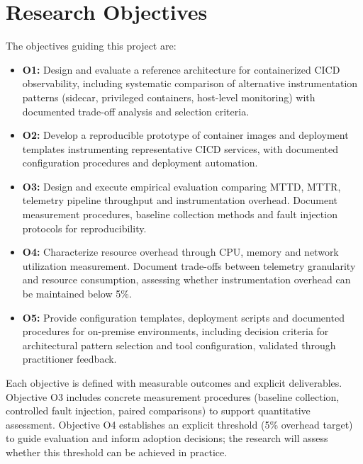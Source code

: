 \section{Research Objectives}
The objectives guiding this project are:
\begin{itemize}
    \item \textbf{O1:} Design and evaluate a reference architecture for containerized \ac{CICD} observability, including systematic comparison of alternative instrumentation patterns (sidecar, privileged containers, host-level monitoring) with documented trade-off analysis and selection criteria.
    \item \textbf{O2:} Develop a reproducible prototype of container images and deployment templates instrumenting representative \ac{CICD} services, with documented configuration procedures and deployment automation.
    \item \textbf{O3:} Design and execute empirical evaluation comparing \ac{MTTD}, \ac{MTTR}, telemetry pipeline throughput and instrumentation overhead. Document measurement procedures, baseline collection methods and fault injection protocols for reproducibility.
    \item \textbf{O4:} Characterize resource overhead through CPU, memory and network utilization measurement. Document trade-offs between telemetry granularity and resource consumption, assessing whether instrumentation overhead can be maintained below 5\%.
    \item \textbf{O5:} Provide configuration templates, deployment scripts and documented procedures for on-premise environments, including decision criteria for architectural pattern selection and tool configuration, validated through practitioner feedback.
\end{itemize}

Each objective is defined with measurable outcomes and explicit deliverables. Objective O3 includes concrete measurement procedures (baseline collection, controlled fault injection, paired comparisons) to support quantitative assessment. Objective O4 establishes an explicit threshold (5\% overhead target) to guide evaluation and inform adoption decisions; the research will assess whether this threshold can be achieved in practice.

